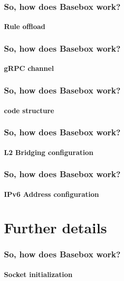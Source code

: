 \documentclass[11pt]{beamer}
\begin{document}
\begin{frame}
\frametitle{So, how does Basebox work?}
\framesubtitle{Rule offload}


\end{frame}

\begin{frame}
\frametitle{So, how does Basebox work?}
\framesubtitle{gRPC channel}


\end{frame}

\begin{frame}
\frametitle{So, how does Basebox work?}
\framesubtitle{code structure}


\end{frame}

\begin{frame}
\frametitle{So, how does Basebox work?}
\framesubtitle{L2 Bridging configuration}

\end{frame}

\begin{frame}
\frametitle{So, how does Basebox work?}
\framesubtitle{IPv6 Address configuration}


\end{frame}



\section{Further details}
\begin{frame}
\frametitle{So, how does Basebox work?}
\framesubtitle{Socket initialization}

\end{frame}




\end{document}
